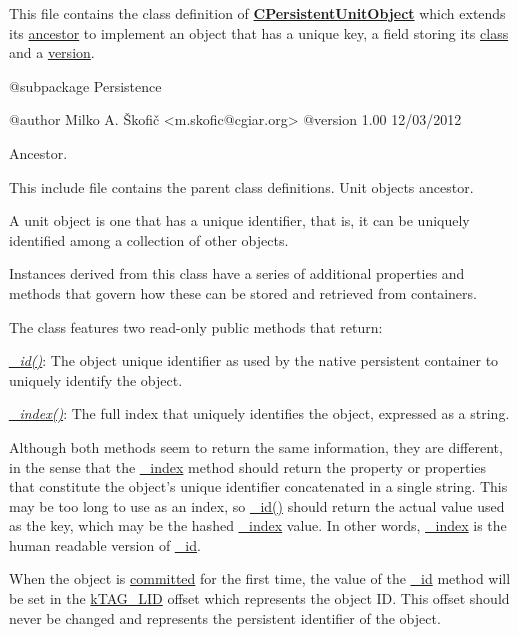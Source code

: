This file contains the class definition of {\bfseries \hyperlink{class_c_persistent_unit_object}{C\-Persistent\-Unit\-Object}} which extends its \hyperlink{class_c_persistent_object}{ancestor} to implement an object that has a unique key, a field storing its \hyperlink{}{class} and a \hyperlink{}{version}.

\begin{DoxyVerb}    @subpackage     Persistence

    @author         Milko A. Škofič <m.skofic@cgiar.org>
    @version        1.00 12/03/2012\end{DoxyVerb}


Ancestor.

This include file contains the parent class definitions. Unit objects ancestor.

A unit object is one that has a unique identifier, that is, it can be uniquely identified among a collection of other objects.

Instances derived from this class have a series of additional properties and methods that govern how these can be stored and retrieved from containers.

The class features two read-\/only public methods that return\-:


\begin{DoxyItemize}
\item {\itshape \hyperlink{}{\-\_\-id()}}\-: The object unique identifier as used by the native persistent container to uniquely identify the object. 
\item {\itshape \hyperlink{}{\-\_\-index()}}\-: The full index that uniquely identifies the object, expressed as a string. 
\end{DoxyItemize}

Although both methods seem to return the same information, they are different, in the sense that the \hyperlink{}{\-\_\-index} method should return the property or properties that constitute the object's unique identifier concatenated in a single string. This may be too long to use as an index, so \hyperlink{}{\-\_\-id()} should return the actual value used as the key, which may be the hashed \hyperlink{}{\-\_\-index} value. In other words, \hyperlink{}{\-\_\-index} is the human readable version of \hyperlink{}{\-\_\-id}.

When the object is \hyperlink{}{committed} for the first time, the value of the \hyperlink{}{\-\_\-id} method will be set in the \hyperlink{}{k\-T\-A\-G\-\_\-\-L\-I\-D} offset which represents the object I\-D. This offset should never be changed and represents the persistent identifier of the object.

